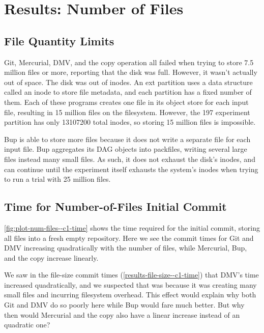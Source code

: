 
\section{Results: Number of Files}
\label{results-num-files}

\subsection{File Quantity Limits}

Git, Mercurial, DMV, and the copy operation all failed when trying to store
\num{7.5} million files or more, reporting that the disk was full. However, it
wasn't actually out of space. The disk was out of inodes. An ext partition uses
a data structure called an inode to store file metadata, and each partition has
a fixed number of them. Each of these programs creates one file in
its object store for each input file, resulting in \num{15} million files on the
filesystem. However, the \SI{197}{\gib} experiment partition has only
\num{13107200} total inodes, so storing \num{15} million files is impossible.

Bup is able to store more files because it does not write a separate file for
each input file. Bup aggregates its DAG objects into \glspl{packfile}, writing
several large files instead many small files. As such, it does not exhaust the
disk's inodes, and can continue until the experiment itself exhausts the
system's inodes when trying to run a trial with \num{25} million files.

%


\subsection{Time for Number-of-Files Initial Commit}
\label{results-num-files--c1-time}

\autoref{fig:plot-num-files--c1-time} shows the time required for the initial
\gls{commit}, storing all files into a fresh empty repository. Here we see the
commit times for Git and DMV increasing quadratically with the number of files,
while Mercurial, Bup, and the copy increase linearly.

We saw in the file-size commit times (\autoref{results-file-size--c1-time}) that
DMV's time increased quadratically, and we suspected that was because it was
creating many small files and incurring filesystem overhead. This effect would
explain why both Git and DMV do so poorly here while Bup would fare much better.
But why then would Mercurial and the copy also have a linear increase instead of
an quadratic one?

